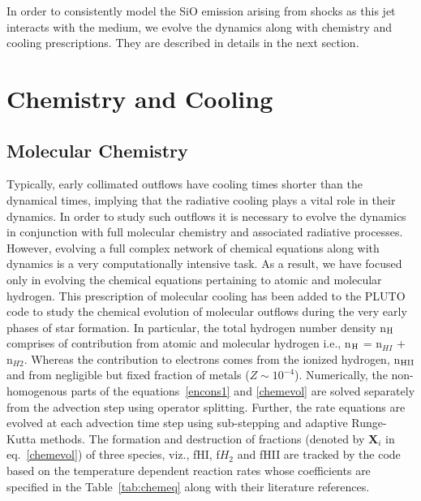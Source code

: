 \documentclass[useAMS,usenatbib]{mn2e}
\begin{document}
In order to consistently model the SiO emission arising from shocks as
this jet interacts with the medium, we evolve the dynamics along with
chemistry and cooling prescriptions. They are described in details in
the next section.

\section{Chemistry and Cooling}
\label{sec:chem}
\subsection{Molecular Chemistry}
\label{ssec:molcool}
Typically, early collimated outflows have cooling times shorter than
the dynamical times, implying that the radiative cooling plays a vital
role in their dynamics. In order to study such outflows it is necessary to evolve
the dynamics in conjunction with full molecular chemistry and
associated radiative processes. However, evolving a full complex
network of chemical equations along with dynamics is a very
computationally intensive task. As a result, we have focused only in
evolving the chemical equations pertaining to atomic and molecular
hydrogen. This prescription of molecular cooling has been added to the PLUTO
code to study the chemical evolution of molecular outflows during the
very early phases of star formation. In particular, the total hydrogen
number density n$_{\rm H}$ comprises of contribution from atomic and
molecular hydrogen i.e., n$_{\rm H}$ = n$_{HI}$ + n$_{H2}$. Whereas
the contribution to electrons comes from the ionized hydrogen, n$_{\rm HII}$ and
from negligible but fixed fraction of metals ($Z \sim 10^{-4}$).
%
Numerically, the
non-homogenous parts of the equations~\ref{encons1} and \ref{chemevol} 
are solved separately from the advection step
using operator splitting. Further, the rate equations are evolved at each advection time
step using sub-stepping and adaptive Runge-Kutta methods.
The formation and destruction of
fractions (denoted by \textbf{X}$_{i}$ in eq.~\ref{chemevol}) of three species, viz., fHI, f$H_{2}$
and fHII are tracked by the code based on the temperature dependent reaction rates
whose coefficients are specified 
in the Table~\ref{tab:chemeq} along with their literature references. 

\end{document}
